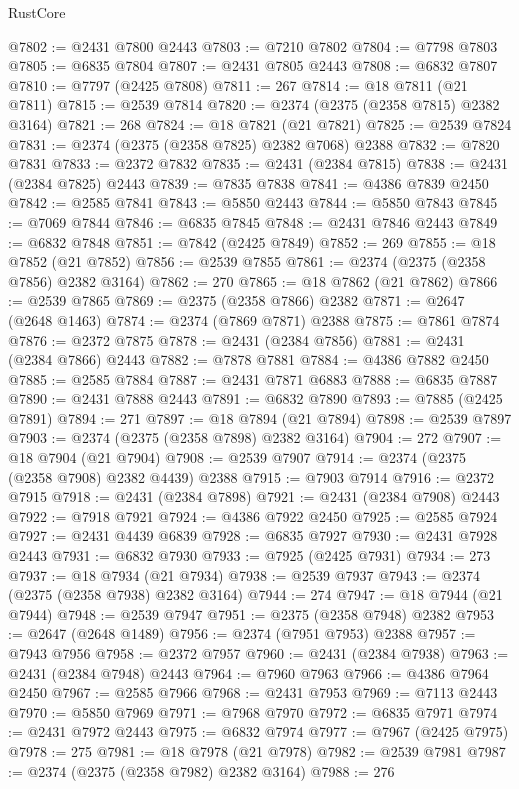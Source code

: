 \begin{lexlean}{RustCore}
\begin{coremodule}
@7802 := @2431 @7800 @2443
@7803 := @7210 @7802
@7804 := @7798 @7803
@7805 := @6835 @7804
@7807 := @2431 @7805 @2443
@7808 := @6832 @7807
@7810 := @7797 (@2425 @7808)
@7811 := 267
@7814 := @18 @7811 (@21 @7811)
@7815 := @2539 @7814
@7820 := @2374 (@2375 (@2358 @7815) @2382 @3164)
@7821 := 268
@7824 := @18 @7821 (@21 @7821)
@7825 := @2539 @7824
@7831 := @2374 (@2375 (@2358 @7825) @2382 @7068) @2388
@7832 := @7820 @7831
@7833 := @2372 @7832
@7835 := @2431 (@2384 @7815)
@7838 := @2431 (@2384 @7825) @2443
@7839 := @7835 @7838
@7841 := @4386 @7839 @2450
@7842 := @2585 @7841
@7843 := @5850 @2443
@7844 := @5850 @7843
@7845 := @7069 @7844
@7846 := @6835 @7845
@7848 := @2431 @7846 @2443
@7849 := @6832 @7848
@7851 := @7842 (@2425 @7849)
@7852 := 269
@7855 := @18 @7852 (@21 @7852)
@7856 := @2539 @7855
@7861 := @2374 (@2375 (@2358 @7856) @2382 @3164)
@7862 := 270
@7865 := @18 @7862 (@21 @7862)
@7866 := @2539 @7865
@7869 := @2375 (@2358 @7866) @2382
@7871 := @2647 (@2648 @1463)
@7874 := @2374 (@7869 @7871) @2388
@7875 := @7861 @7874
@7876 := @2372 @7875
@7878 := @2431 (@2384 @7856)
@7881 := @2431 (@2384 @7866) @2443
@7882 := @7878 @7881
@7884 := @4386 @7882 @2450
@7885 := @2585 @7884
@7887 := @2431 @7871 @6883
@7888 := @6835 @7887
@7890 := @2431 @7888 @2443
@7891 := @6832 @7890
@7893 := @7885 (@2425 @7891)
@7894 := 271
@7897 := @18 @7894 (@21 @7894)
@7898 := @2539 @7897
@7903 := @2374 (@2375 (@2358 @7898) @2382 @3164)
@7904 := 272
@7907 := @18 @7904 (@21 @7904)
@7908 := @2539 @7907
@7914 := @2374 (@2375 (@2358 @7908) @2382 @4439) @2388
@7915 := @7903 @7914
@7916 := @2372 @7915
@7918 := @2431 (@2384 @7898)
@7921 := @2431 (@2384 @7908) @2443
@7922 := @7918 @7921
@7924 := @4386 @7922 @2450
@7925 := @2585 @7924
@7927 := @2431 @4439 @6839
@7928 := @6835 @7927
@7930 := @2431 @7928 @2443
@7931 := @6832 @7930
@7933 := @7925 (@2425 @7931)
@7934 := 273
@7937 := @18 @7934 (@21 @7934)
@7938 := @2539 @7937
@7943 := @2374 (@2375 (@2358 @7938) @2382 @3164)
@7944 := 274
@7947 := @18 @7944 (@21 @7944)
@7948 := @2539 @7947
@7951 := @2375 (@2358 @7948) @2382
@7953 := @2647 (@2648 @1489)
@7956 := @2374 (@7951 @7953) @2388
@7957 := @7943 @7956
@7958 := @2372 @7957
@7960 := @2431 (@2384 @7938)
@7963 := @2431 (@2384 @7948) @2443
@7964 := @7960 @7963
@7966 := @4386 @7964 @2450
@7967 := @2585 @7966
@7968 := @2431 @7953
@7969 := @7113 @2443
@7970 := @5850 @7969
@7971 := @7968 @7970
@7972 := @6835 @7971
@7974 := @2431 @7972 @2443
@7975 := @6832 @7974
@7977 := @7967 (@2425 @7975)
@7978 := 275
@7981 := @18 @7978 (@21 @7978)
@7982 := @2539 @7981
@7987 := @2374 (@2375 (@2358 @7982) @2382 @3164)
@7988 := 276

\end{coremodule}
\end{lexlean}
